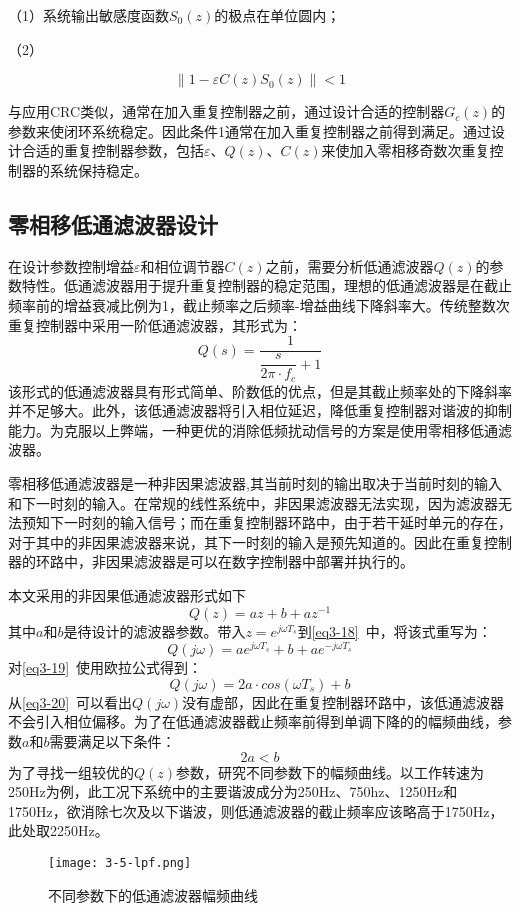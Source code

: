 \documentclass[
  lang=cn,
  degree=master,
  openany,oneside
]{nuaathesis}
\begin{document}
（1）系统输出敏感度函数$S_0(z)$的极点在单位圆内；

（2） 

	\begin{equation}
		\label{eq_stable_odd}
		\left\|1 - \varepsilon C(z)S_0(z) \right\| < 1
	\end{equation}
	
与应用CRC类似，通常在加入重复控制器之前，通过设计合适的控制器$G_c(z)$的参数来使闭环系统稳定。因此条件1通常在加入重复控制器之前得到满足。通过设计合适的重复控制器参数，包括$\varepsilon$、$Q(z)$、$C(z)$来使加入零相移奇数次重复控制器的系统保持稳定。
\subsection{零相移低通滤波器设计}
在设计参数控制增益$\varepsilon$和相位调节器$C(z)$之前，需要分析低通滤波器$Q(z)$的参数特性。低通滤波器用于提升重复控制器的稳定范围，理想的低通滤波器是在截止频率前的增益衰减比例为1，截止频率之后频率-增益曲线下降斜率大。传统整数次重复控制器中采用一阶低通滤波器，其形式为：
\begin{equation}
Q(s)=\dfrac{1}{\dfrac{s}{2\pi\cdot f_c}+1}
\end{equation}
该形式的低通滤波器具有形式简单、阶数低的优点，但是其截止频率处的下降斜率并不足够大。此外，该低通滤波器将引入相位延迟，降低重复控制器对谐波的抑制能力。为克服以上弊端，一种更优的消除低频扰动信号的方案是使用零相移低通滤波器。

零相移低通滤波器是一种非因果滤波器,其当前时刻的输出取决于当前时刻的输入和下一时刻的输入。在常规的线性系统中，非因果滤波器无法实现，因为滤波器无法预知下一时刻的输入信号；而在重复控制器环路中，由于若干延时单元的存在，对于其中的非因果滤波器来说，其下一时刻的输入是预先知道的。因此在重复控制器的环路中，非因果滤波器是可以在数字控制器中部署并执行的。

本文采用的非因果低通滤波器形式如下
\begin{equation}
\label{eq3-18}
Q(z)=az+b+az^{-1}
\end{equation}
其中$a$和$b$是待设计的滤波器参数。带入$z=e^{j\omega T_s}$到\autoref{eq3-18}~中，将该式重写为：
\begin{equation}
\label{eq3-19}
Q(j\omega)=ae^{j\omega T_s}+b+ae^{-j\omega T_s}
\end{equation}
对\autoref{eq3-19}~使用欧拉公式得到：
\begin{equation}
\label{eq3-20}
Q(j\omega)=2a\cdot cos(\omega T_s)+b
\end{equation}
从\autoref{eq3-20}~可以看出$Q(j\omega)$没有虚部，因此在重复控制器环路中，该低通滤波器不会引入相位偏移。为了在低通滤波器截止频率前得到单调下降的的幅频曲线，参数$a$和$b$需要满足以下条件：
\begin{equation}
\label{eq3-21}
2a<b
\end{equation}
为了寻找一组较优的$Q(z)$参数，研究不同参数下的幅频曲线。以工作转速为250Hz为例，此工况下系统中的主要谐波成分为250Hz、750hz、1250Hz和1750Hz，欲消除七次及以下谐波，则低通滤波器的截止频率应该略高于1750Hz，此处取2250Hz。
\begin{figure}[h!]
	\texttt{[image: 3-5-lpf.png]}
	\caption{不同参数下的低通滤波器幅频曲线}
	\label{fig:3-5-lpf}
\end{figure}
\end{document}
